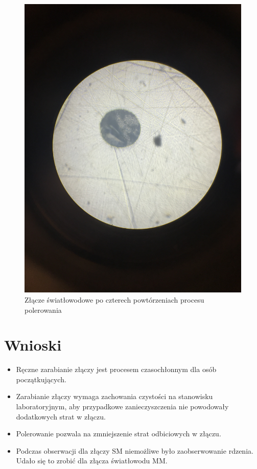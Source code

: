 \documentclass[12pt, a4paper, oneside]{article}
\begin{document}
\begin{figure}[t]
\centering
\caption{Złącze światłowodowe po czterech powtórzeniach procesu polerowania}
\includegraphics[scale=0.11]{m7.jpg}
\end{figure}
\section{Wnioski}
\begin{itemize}
\item Ręczne zarabianie złączy jest procesem czasochłonnym dla osób początkujących.
\item Zarabianie złączy wymaga zachowania czystości na stanowisku laboratoryjnym, aby przypadkowe zanieczyszczenia nie powodowały dodatkowych strat w złączu.
\item Polerowanie pozwala na zmniejszenie strat odbiciowych w złączu.
\item Podczas obserwacji dla złączy SM niemożliwe było zaobserwowanie rdzenia. Udało się to zrobić dla złącza światłowodu MM. 
\end{itemize}
\end{document}
